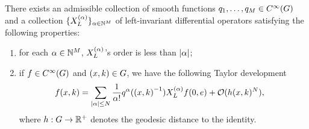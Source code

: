 \begin{proposition}
    There exists an admissible collection of smooth functions $q_1, \dots, q_M \in {C^\infty(G)}$
    and a collection $\{X^{(\alpha)}_L\}_{\alpha \in \mathbb{N}^M}$ of left-invariant differential operators satisfying the following properties:
    \begin{enumerate}
        \item for each $\alpha \in \mathbb{N}^M$, $X^{(\alpha)}_L$'s order is less than $\left|{\alpha}\right|$;
        \item if $f \in {C^\infty(G)}$ and $(x, k) \in G$,
            we have the following Taylor development
            \begin{align*}
                f(x, k) &= \sum_{\left|{\alpha}\right| \leq N} \frac{1}{\alpha!} q^\alpha({(x, k)}^{-1}) X^{(\alpha)}_L f(0, e) + \mathcal{O}(h(x, k)^N),
            \end{align*}
            where $h : G \to \mathbb{R}^+$ denotes the geodesic distance to the identity.
    \end{enumerate}
\end{proposition}
